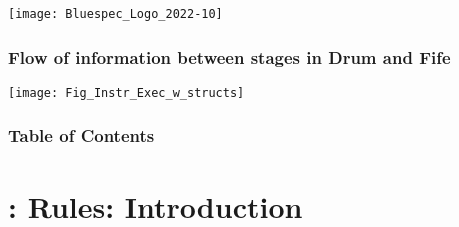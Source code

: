


\date{L13: {\BSV}: Rules and their semantics}





\begin{frame}
 \titlepage

 \begin{center}
  \texttt{[image: Bluespec\_Logo\_2022-10]}
 \end{center}

\end{frame}





\begin{frame}
\frametitle{Flow of information between stages in Drum and Fife}

\label{Slide_Instr_Steps}

\footnotesize

\begin{center}
 \texttt{[image: Fig\_Instr\_Exec\_w\_structs]}
\end{center}

\end{frame}


\begin{frame}
\frametitle{Table of Contents}

\tableofcontents

\end{frame}


\section{{\BSV}: Rules: Introduction}


